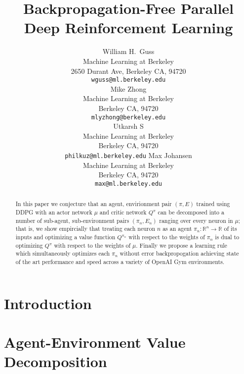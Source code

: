\documentclass{article} %
\title{Backpropagation-Free Parallel Deep Reinforcement Learning}
\author{
William H.~Guss \\
Machine Learning at Berkeley\\
2650 Durant Ave, Berkeley CA, 94720 \\
\texttt{wguss@ml.berkeley.edu} \\
\And
Mike Zhong \\
Machine Learning at Berkeley \\
Berkeley CA, 94720 \\
\texttt{mlyzhong@berkeley.edu} \\
\And
Utkarsh S \\
Machine Learning at Berkeley \\
Berkeley CA, 94720 \\
\texttt{philkuz@ml.berkeley.edu}
\And
Max Johansen \\
Machine Learning at Berkeley \\
Berkeley CA, 94720 \\
\texttt{max@ml.berkeley.edu}
}
\numberwithin{equation}{subsection}
\numberwithin{theorem}{subsection}
\begin{document}
\maketitle

\begin{abstract}
    In this paper we conjecture that an agent, envirionment pair $(\pi, E)$ trained using DDPG with an actor network $\mu$ and critic network $Q^{\pi}$ can be decomposed into a number of sub-agent, sub-environment pairs  $(\pi_n, E_n)$ ranging over every neuron in $\mu$; that is, we show empircially that treating each neuron $n$ as an agent $\pi_n: \mathbb{R}^n \to \mathbb{R}$ of its inputs and optimizing a value function $Q^{\pi_n}$ with respect to the weights of $\pi_n$ is dual to optimizing $Q^\pi$ with respect to the weights of $\mu$. Finally we propose a learning rule which simultaneously optimizes each $\pi_n$ without error backpropogation achieving state of the art performance and speed across a variety of OpenAI Gym environments.
\end{abstract}
\listoftodos


\section{Introduction}




\section{Agent-Environment Value Decomposition}


\end{document}
